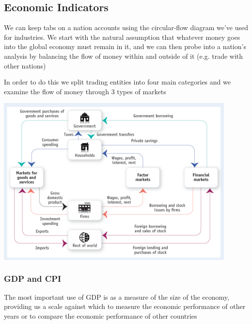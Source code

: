 \documentclass[english,course,draft]{Notes}
\begin{document}
\subsection{Economic Indicators}


\par{We can keep tabs on a nation accounts using the circular-flow diagram we've used for industries. We start with the natural assumption that whatever money goes into the global economy must remain in it, and we can then probe into a nation's analysis by balancing the flow of money within and outside of it (e.g. trade with other nations)}
\par{In order to do this we split trading entities into four main categories  and we examine the flow of money through 3 types of markets  }

\includegraphics[width=0.9\textwidth]{macroFlow}

\subsubsection{GDP and CPI}




\par{ The most important use of GDP is as a measure of the size of the economy,
providing us a scale against which to measure the economic performance of
other years or to compare the economic performance of other countries}
\end{document}
